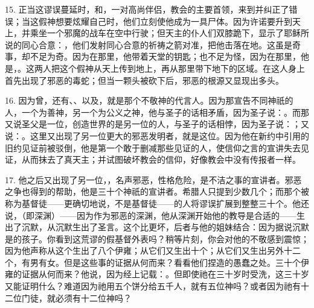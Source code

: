 15. 正当这谬误蔓延时，和，一对高尚伴侣，教会的主要首领，来到并纠正了错误；当这假神想要炫耀自己时，他们立刻使他成为一具尸体。因为许诺要升到天上，并乘坐一个邪魔的战车在空中行驶；但天主的仆人们双膝跪下，显示了耶稣所说的同心合意：，他们发射同心合意的祈祷之箭对准，把他击落在地。这虽是奇事，却不足为奇。因为在那里，他带着天堂的钥匙；也不足为怪，因为在那里，他是，。这两人把这个假神从天上传到地上，再从那里带下地下的区域。在这人身上首先出现了邪恶的毒蛇；但当一颗头被砍下后，邪恶的根源又显现出多头。\par

16. 因为曾，还有、、以及，就是那个不敬神的代言人。因为那宣告不同神祇的人，一个为善神，另一个为公义之神，他与圣子的话相矛盾，因为圣子说：。而那又说圣父是一位，创造世界的是另一位的人，与圣子的话相悖，因为圣子说：；又说：。这里又出现了另一位更大的邪恶发明者，就是这位。因为他在新约中引用的旧约见证前被驳倒，他是第一个敢于删减那些见证的人，使信仰之言的宣讲失去见证，从而抹去了真天主；并试图破坏教会的信仰，好像教会中没有传报者一样。\par

17. 他之后又出现了另一位，，名声邪恶，性格危险，是不洁之事的宣讲者。邪恶之争也得到的帮助，他是三十个神祇的宣讲者。希腊人只提到少数几个；而那个被称为基督徒——更确切地说，不是基督徒——的人将谬误扩展到整整三十个。他还说，（即深渊）——因为作为邪恶的深渊，他从深渊开始他的教导是合适的——生出了沉默，从沉默生出了圣言。这个比更坏，后者与他的姐妹结合：因为据说沉默是的孩子。你看到这荒谬的假基督外表吗？稍等片刻，你会对他的不敬感到震惊；因为他声称从这个生出了八个伊雍；从它们又生出十个；从它们又生出另外十二个，有男有女。但是这些事的证据从何而来？看看他们捏造的愚蠢之处。三十个伊雍的证据从何而来？他说，因为经上记载：。但即使祂在三十岁时受洗，这三十岁又能证明什么？难道因为祂用五个饼分给五千人，就有五位神吗？或者因为祂有十二位门徒，就必须有十二位神吗？\par

